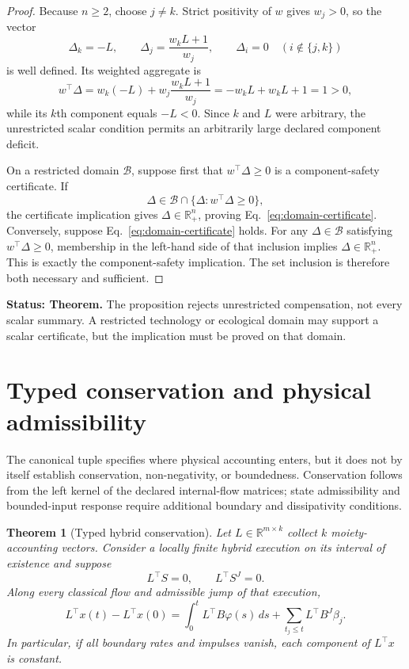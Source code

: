 \documentclass[11pt]{article}
\newtheorem{theorem}{Theorem}
\theoremstyle{definition}
\newcommand{\R}{\mathbb R}
\newcommand{\Rp}{\mathbb R_+}
\newcommand{\status}[1]{\par\smallskip\noindent\textbf{Status: #1.}\quad}
\begin{document}
\begin{proof}
Because $n\ge2$, choose $j\ne k$. Strict positivity of $w$ gives $w_j>0$, so the vector
\[
\Delta_k=-L,
\qquad \Delta_j=\frac{w_kL+1}{w_j},
\qquad \Delta_i=0\quad(i\notin\{j,k\})
\]
is well defined. Its weighted aggregate is
\[
w^\top \Delta=w_k(-L)+w_j\frac{w_kL+1}{w_j}=-w_kL+w_kL+1=1>0,
\]
while its $k$th component equals $-L<0$. Since $k$ and $L$ were arbitrary, the unrestricted scalar condition permits an arbitrarily large declared component deficit.

On a restricted domain $\mathcal B$, suppose first that $w^\top \Delta\ge0$ is a component-safety certificate. If
\[
\Delta\in\mathcal B\cap\{\Delta:w^\top \Delta\ge0\},
\]
the certificate implication gives $\Delta\in\Rp^n$, proving Eq.~\eqref{eq:domain-certificate}. Conversely, suppose Eq.~\eqref{eq:domain-certificate} holds. For any $\Delta\in\mathcal B$ satisfying $w^\top \Delta\ge0$, membership in the left-hand side of that inclusion implies $\Delta\in\Rp^n$. This is exactly the component-safety implication. The set inclusion is therefore both necessary and sufficient.
\end{proof}

\status{Theorem} The proposition rejects unrestricted compensation, not every scalar summary. A restricted technology or ecological domain may support a scalar certificate, but the implication must be proved on that domain.

\section{Typed conservation and physical admissibility}

The canonical tuple specifies where physical accounting enters, but it does not by itself establish conservation, non-negativity, or boundedness. Conservation follows from the left kernel of the declared internal-flow matrices; state admissibility and bounded-input response require additional boundary and dissipativity conditions.

\begin{theorem}[Typed hybrid conservation]
\label{thm:conservation}
Let $L\in\R^{m\times k}$ collect $k$ moiety-accounting vectors. Consider a locally finite hybrid execution on its interval of existence and suppose
\[
L^\top S=0,\qquad L^\top S^J=0.
\]
Along every classical flow and admissible jump of that execution,
\begin{equation}
L^\top x(t)-L^\top x(0)
=\int_0^t L^\top B\varphi(s)\,ds
+\sum_{t_j\le t}L^\top B^J\beta_j.
\label{eq:hybrid-balance}
\end{equation}
In particular, if all boundary rates and impulses vanish, each component of $L^\top x$ is constant.
\end{theorem}
\end{document}
